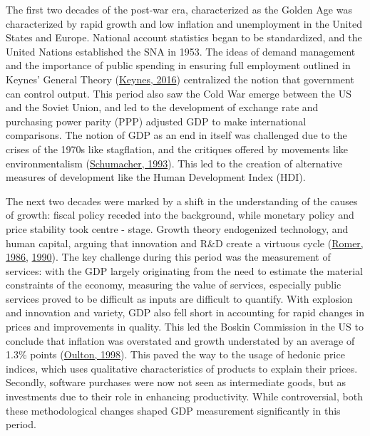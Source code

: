 \documentclass[12pt,nobind, a4paper]{reedthesis}
\begin{document}
 The first two decades of the post-war era, characterized as the Golden Age was characterized by rapid growth and low inflation and unemployment in the United States and Europe. National account statistics began to be standardized, and the United Nations established the SNA in 1953. The ideas of demand management and the importance of public spending in ensuring full employment outlined in Keynes' General Theory (\protect\hyperlink{ref-keynes_general_2016}{Keynes, 2016}) centralized the notion that government can control output. This period also saw the Cold War emerge between the US and the Soviet Union, and led to the development of exchange rate and purchasing power parity (PPP) adjusted GDP to make international comparisons. The notion of GDP as an end in itself was challenged due to the crises of the 1970s like stagflation, and the critiques offered by movements like environmentalism (\protect\hyperlink{ref-schumacher_small_1993}{Schumacher, 1993}). This led to the creation of alternative measures of development like the Human Development Index (HDI).
 \linebreak

 The next two decades were marked by a shift in the understanding of the causes of growth: fiscal policy receded into the background, while monetary policy and price stability took centre - stage. Growth theory endogenized technology, and human capital, arguing that innovation and R\&D create a virtuous cycle (\protect\hyperlink{ref-romer_increasing_1986}{Romer, 1986}, \protect\hyperlink{ref-romer_endogenous_1990}{1990}). The key challenge during this period was the measurement of services: with the GDP largely originating from the need to estimate the material constraints of the economy, measuring the value of services, especially public services proved to be difficult as inputs are difficult to quantify. With explosion and innovation and variety, GDP also fell short in accounting for rapid changes in prices and improvements in quality. This led the Boskin Commission in the US to conclude that inflation was overstated and growth understated by an average of 1.3\% points (\protect\hyperlink{ref-oulton_implications_1998}{Oulton, 1998}). This paved the way to the usage of hedonic price indices, which uses qualitative characteristics of products to explain their prices. Secondly, software purchases were now not seen as intermediate goods, but as investments due to their role in enhancing productivity. While controversial, both these methodological changes shaped GDP measurement significantly in this period.
 \linebreak
\end{document}
